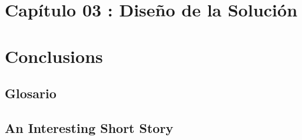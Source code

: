 \documentclass[pdftex,spanish]{pucthesis}	%
\begin{document}
\chapter[Capítulo 03 : Diseño de la Solución]{Capítulo 03 : Diseño de la Solución} \label{ch3}


\chapter[Conclusiones]{Conclusions}



\cleardoublepage
{} \label{references}

\renewcommand{\bibname}{REFERENCES}



\appendix %

\newpage
\section[Glosario]{Glosario} \label{dictionary}


\newpage
\section[An Interesting Short Story]{An Interesting Short Story}

\end{document}
